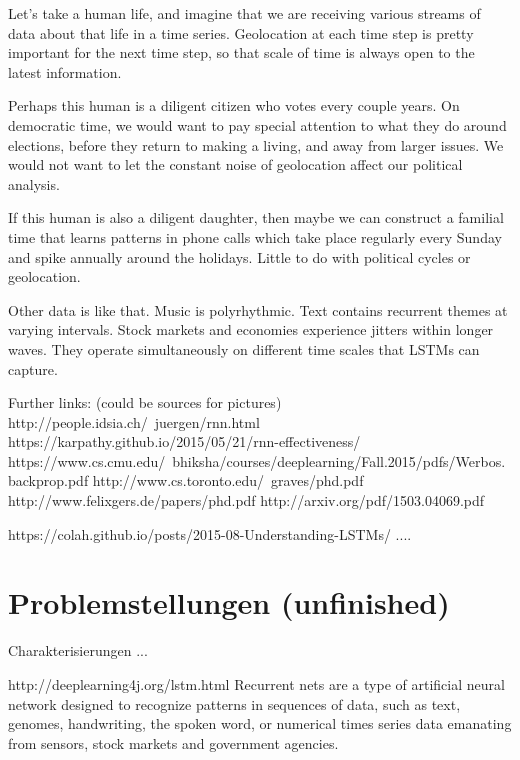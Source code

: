 {Let’s take a human life, and imagine that we are receiving various streams of data about that life in a time series. Geolocation at each time step is pretty important for the next time step, so that scale of time is always open to the latest information.

Perhaps this human is a diligent citizen who votes every couple years. On democratic time, we would want to pay special attention to what they do around elections, before they return to making a living, and away from larger issues. We would not want to let the constant noise of geolocation affect our political analysis.

If this human is also a diligent daughter, then maybe we can construct a familial time that learns patterns in phone calls which take place regularly every Sunday and spike annually around the holidays. Little to do with political cycles or geolocation.

Other data is like that. Music is polyrhythmic. Text contains recurrent themes at varying intervals. Stock markets and economies experience jitters within longer waves. They operate simultaneously on different time scales that LSTMs can capture.

Further links: (could be sources for pictures)
http://people.idsia.ch/~juergen/rnn.html
https://karpathy.github.io/2015/05/21/rnn-effectiveness/
https://www.cs.cmu.edu/~bhiksha/courses/deeplearning/Fall.2015/pdfs/Werbos.backprop.pdf
http://www.cs.toronto.edu/~graves/phd.pdf
http://www.felixgers.de/papers/phd.pdf
http://arxiv.org/pdf/1503.04069.pdf


https://colah.github.io/posts/2015-08-Understanding-LSTMs/
....

\section{Problemstellungen (unfinished)}
Charakterisierungen ...

http://deeplearning4j.org/lstm.html
Recurrent nets are a type of artificial neural network designed to recognize patterns in sequences of data, such as text, genomes, handwriting, the spoken word, or numerical times series data emanating from sensors, stock markets and government agencies.

} %